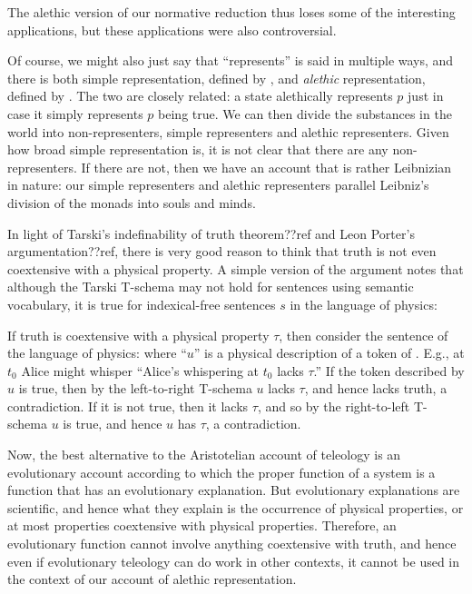 The alethic version  of our normative reduction thus loses some of the interesting applications,
but these applications were also controversial. 

Of course, we might also just say that ``represents'' is said in multiple ways, and there is both simple representation,
defined by , and \textit{alethic} representation, defined by . The two are 
closely related: a state alethically represents $p$ just in case it simply represents $p$ being true. We can then
divide the substances in the world into non-representers, simple representers and alethic representers. Given how 
broad simple representation is, it is not clear that there are any non-representers. If there are not, then we have 
an account that is rather Leibnizian in nature: our simple representers and alethic representers parallel Leibniz's 
division of the monads into souls and minds. 

In light of Tarski's indefinability of truth theorem??ref and Leon Porter's argumentation??ref, there is very good 
reason to think that truth is not even coextensive with a physical property. A simple version of the argument notes that 
although the Tarski T-schema 
may not hold for sentences using semantic vocabulary, it is true for indexical-free sentences $s$ in the language of physics:

If truth is coextensive with a physical property $\tau$, then consider the sentence of the language of physics:
where ``$u$'' is a physical description of a token of . E.g., at $t_0$ Alice might whisper ``Alice's whispering 
at $t_0$ lacks $\tau$.'' If the token described by $u$ is true, then by the left-to-right T-schema $u$ lacks $\tau$, and hence
lacks truth, a contradiction. If it is not true, then it lacks $\tau$, and so by the right-to-left T-schema $u$ is true, 
and hence $u$ has $\tau$, a contradiction. 

Now, the best alternative to the Aristotelian account of teleology is an evolutionary account according to which the 
proper function of a system is a function that has an evolutionary explanation. But evolutionary explanations are 
scientific, and hence what they explain is the occurrence of physical properties, or at most properties coextensive 
with physical properties. Therefore, an evolutionary function cannot involve anything coextensive with truth, and hence 
even if evolutionary teleology can do work in other contexts, it cannot be used in the context of our account of 
alethic representation.

